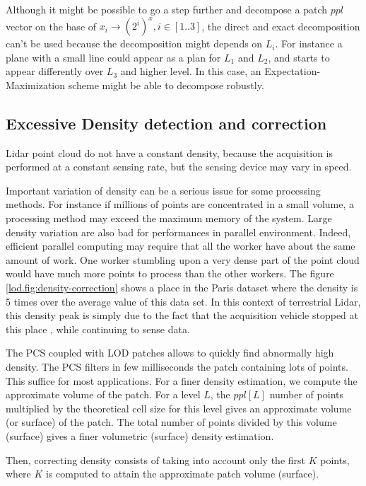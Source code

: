 		Although it might be possible to go a step further and decompose a patch $ppl$ vector on the base of $x_i \rightarrow (2^i)^x, i \in [1..3]$, the direct and exact decomposition can't be used because the decomposition might depends on $L_i$. For instance a plane with a small line could appear as a plan for $L_1$ and $L_2$, and starts to appear differently over $L_3$ and higher level. In this case, an Expectation-Maximization scheme might be able to decompose robustly.
 
	\subsection{Excessive Density detection and correction}
		\label{lod.method.density}
		Lidar point cloud do not have a constant density, because the acquisition is performed at a constant sensing rate, but the sensing device may vary in speed.
		
		Important variation of density can be a serious issue for some processing methods. 
		For instance if millions of points are concentrated in a small volume,
		a processing method may exceed the maximum memory of the system.
		Large density variation are also bad for performances in parallel environment.
		Indeed, efficient parallel computing may require that all the worker have about the same amount of work.
		One worker stumbling upon a very dense part of the point cloud would have much more points to process than the other workers.
		The figure \ref{lod.fig:density-correction} shows a place in the Paris dataset where the density is 5 times over the average value of this data set.
		In this context of terrestrial Lidar, this density peak is simply due to the fact that the acquisition vehicle stopped at this place
		, while continuing to sense data.
		
		The PCS coupled with LOD patches allows to quickly find abnormally high density.
		The PCS filters in few milliseconds the patch containing lots of points. This suffice for most applications.
		For a finer density estimation, we compute the approximate volume of the patch.
		For a level $L$, the $ppl[L]$ number of points multiplied by the theoretical cell size for this level gives an approximate volume (or surface) of the patch.
		The total number of points divided by this volume (surface) gives a finer volumetric (surface) density estimation.
		
		Then, correcting density consists of taking into account only the first $K$ points, where $K$ is computed to attain the approximate patch volume (surface).
		
